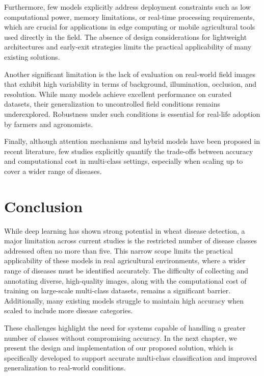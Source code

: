 Furthermore, few models explicitly address deployment constraints such as low computational power, memory limitations, or real-time processing requirements, which are crucial for applications in edge computing or mobile agricultural tools used directly in the field. The absence of design considerations for lightweight architectures and early-exit strategies limits the practical applicability of many existing solutions.

Another significant limitation is the lack of evaluation on real-world field images that exhibit high variability in terms of background, illumination, occlusion, and resolution. While many models achieve excellent performance on curated datasets, their generalization to uncontrolled field conditions remains underexplored. Robustness under such conditions is essential for real-life adoption by farmers and agronomists.

Finally, although attention mechanisms and hybrid models have been proposed in recent literature, few studies explicitly quantify the trade-offs between accuracy and computational cost in multi-class settings, especially when scaling up to cover a wider range of diseases.


\section{Conclusion}
While deep learning has shown strong potential in wheat disease detection, a major limitation across current studies is the restricted number of disease classes addressed often no more than five. This narrow scope limits the practical applicability of these models in real agricultural environments, where a wider range of diseases must be identified accurately. The difficulty of collecting and annotating diverse, high-quality images, along with the computational cost of training on large-scale multi-class datasets, remains a significant barrier. Additionally, many existing models struggle to maintain high accuracy when scaled to include more disease categories.

These challenges highlight the need for systems capable of handling a greater number of classes without compromising accuracy. In the next chapter, we present the design and implementation of our proposed solution, which is specifically developed to support accurate multi-class classification and improved generalization to real-world conditions.